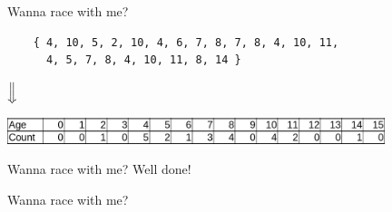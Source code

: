 \documentclass[handout]{beamer} %
\begin{document}

\begin{frame}[fragile]{Wanna race with me?}
	\begin{verbatim}
	{ 4, 10, 5, 2, 10, 4, 6, 7, 8, 7, 8, 4, 10, 11,
	  4, 5, 7, 8, 4, 10, 11, 8, 14 }
	\end{verbatim}
	\centering$\Big\Downarrow$
	\begin{center}
		\includegraphics[width=11cm]{img/array-normal.png}
	\end{center}
\end{frame}


\begin{frame}{Wanna race with me?}
	\centering Well done!
	\begin{center}
	\end{center}
\end{frame}


\begin{frame}{Wanna race with me?}
	\begin{center}
	\end{center}
\end{frame}
\end{document}
